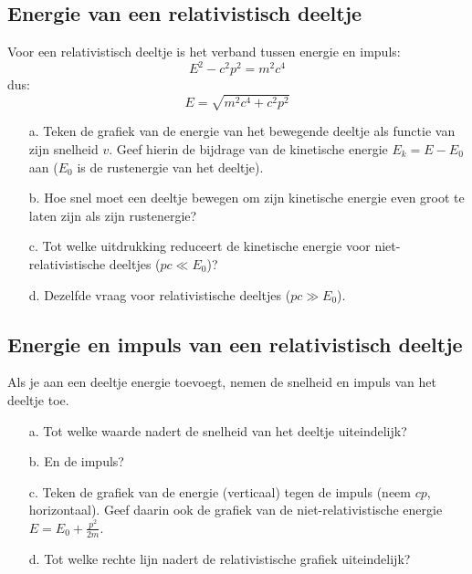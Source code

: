 \subsection{Energie van een relativistisch deeltje}
Voor een relativistisch deeltje is het verband tussen energie en impuls:
\begin{displaymath}
E^{2} - c^{2}p^{2} = m^{2}c^{4}
\end{displaymath}
dus:
\begin{displaymath}
E = \sqrt{m^{2}c^{4} + c^{2}p^{2}}
\end{displaymath}
\begin{itemize}
\item [a.]
Teken de grafiek van de energie van het bewegende deeltje als functie van 
zijn snelheid $v$.
Geef hierin de bijdrage van de kinetische energie $E_{k} = E - E_{0}$
aan ($E_{0}$ is de rustenergie van het deeltje).
\item [b.]
Hoe snel moet een deeltje bewegen om zijn kinetische energie even groot 
te laten zijn als zijn rustenergie?
\item [c.]
Tot welke uitdrukking reduceert de kinetische energie voor niet-relativistische
deeltjes ($pc \ll E_{0}$)?
\item [d.]
Dezelfde vraag voor relativistische deeltjes ($pc \gg E_{0}$).
\end{itemize}


\subsection{Energie en impuls van een relativistisch deeltje}
Als je aan een deeltje energie toevoegt, nemen de snelheid en impuls van het 
deeltje toe.
\begin{itemize}
\item  [a.]
Tot welke waarde nadert de snelheid van het deeltje uiteindelijk?
\item  [b.]
En de impuls?
\item  [c.]
Teken de grafiek van de energie (verticaal) tegen de impuls 
(neem $cp$, horizontaal).
Geef daarin ook de grafiek van de niet-relativistische energie 
$E = E_{0} + \frac{p^{2}}{2m}$.
\item [d.]
Tot welke rechte lijn nadert de relativistische grafiek uiteindelijk?
\end{itemize}

